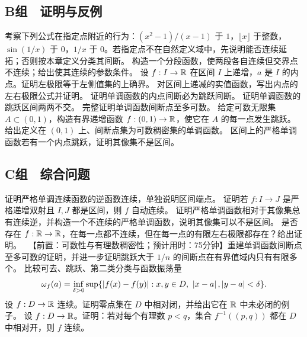 \subsection*{B组　证明与反例}
\begin{enumerate}[label=\textbf{\thechapter.\arabic*.},resume]
  考察下列公式在指定点附近的行为：\((x^2-1)/(x-1)\) 于 \(1\)，\(\lfloor x\rfloor\) 于整数，\(\sin(1/x)\) 于 \(0\)，\(1/x\) 于 \(0\)。若指定点不在自然定义域中，先说明能否连续延拓；否则按本章定义分类其间断。
  构造一个分段函数，使两段各自连续但交界点不连续；给出使其连续的参数条件。
  设 \(f:I\to\mathbb{R}\) 在区间 \(I\) 上递增，\(a\) 是 \(I\) 的内点。证明左极限等于左侧值集的上确界。
  对区间上递减的实值函数，写出内点的左右极限公式并证明。
  证明单调函数的内点间断必为跳跃间断。
  证明单调函数的跳跃区间两两不交。
  完整证明单调函数间断点至多可数。
  给定可数无限集 \(A\subset(0,1)\)，构造有界递增函数 \(f:(0,1)\to\mathbb{R}\)，使它在 \(A\) 的每一点发生跳跃。
  给出定义在 \((0,1)\) 上、间断点集为可数稠密集的单调函数。
  区间上的严格单调函数若有一个内点跳跃，证明其像集不是区间。
\end{enumerate}

\subsection*{C组　综合问题}
\begin{enumerate}[label=\textbf{\thechapter.\arabic*.},resume]
  证明严格单调连续函数的逆函数连续，单独说明区间端点。
  证明若 \(f:I\to J\) 是严格递增双射且 \(I,J\) 都是区间，则 \(f\) 自动连续。
  证明严格单调函数相对于其像集总有连续逆，并构造一个不连续的严格单调函数，说明其像集可以不是区间。
  是否存在 \(f:\mathbb{R}\to\mathbb{R}\)，在每一点都不连续，但在每一点的有限左右极限都存在？给出证明。
  \ 【前置：可数性与有理数稠密性；预计用时：75分钟】重建单调函数间断点至多可数的证明，并进一步证明跳跃大于 \(1/n\) 的间断点在有界值域内只有有限多个。
  比较可去、跳跃、第二类分类与函数振荡量
 \[
 \omega_f(a)=\inf_{\delta>0}\sup\{\left|f(x)-f(y)\right|:x,y\in D,\ \left|x-a\right|,\left|y-a\right|<\delta\}.
 \]
  设 \(f:D\to\mathbb{R}\) 连续。证明零点集在 \(D\) 中相对闭，并给出它在 \(\mathbb{R}\) 中未必闭的例子。
  设 \(f:D\to\mathbb{R}\)。证明：若对每个有理数 \(p<q\)，集合 \(f^{-1}((p,q))\) 都在 \(D\) 中相对开，则 \(f\) 连续。
\end{enumerate}
